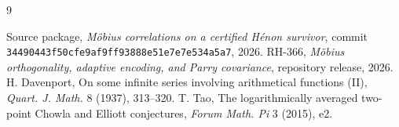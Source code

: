 \documentclass[11pt]{article}
\begin{document}
\begingroup\sloppy
\begin{thebibliography}{9}
\raggedright
{}
Source package, \emph{Möbius correlations on a certified Hénon survivor},
commit \texttt{34490443f50cfe9af9ff93888e51e7e7e534a5a7}, 2026.
RH-366, \emph{Möbius orthogonality, adaptive encoding, and Parry covariance},
repository release, 2026.
H. Davenport, On some infinite series involving arithmetical functions (II),
\emph{Quart. J. Math.} 8 (1937), 313--320.
T. Tao, The logarithmically averaged two-point Chowla and Elliott
conjectures, \emph{Forum Math. Pi} 3 (2015), e2.
\end{thebibliography}
\endgroup
\end{document}
